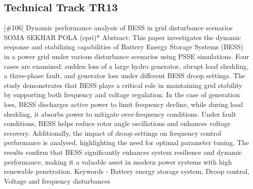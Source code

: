 \clearpage \subsection{Technical Track TR13}\nopagebreak {} \begin{abstract_online} {[\#106] Dynamic performance analysis of BESS in grid disturbance scenarios} {} {SOMA SEKHAR POLA (cpri)*} {} Abstract: This paper investigates the dynamic response and stabilizing capabilities of Battery Energy Storage Systems (BESS) in a power grid under various disturbance scenarios using PSSE simulations. Four cases are examined: sudden loss of a large hydro generator, abrupt load shedding, a three-phase fault, and generator loss under different BESS droop settings. The study demonstrates that BESS plays a critical role in maintaining grid stability by supporting both frequency and voltage regulation. In the case of generation loss, BESS discharges active power to limit frequency decline, while during load shedding, it absorbs power to mitigate over-frequency conditions. Under fault conditions, BESS helps reduce rotor angle oscillations and enhances voltage recovery. Additionally, the impact of droop settings on frequency control performance is analysed, highlighting the need for optimal parameter tuning. The results confirm that BESS significantly enhances system resilience and dynamic performance, making it a valuable asset in modern power systems with high renewable penetration. Keywords - Battery energy storage system, Droop control, Voltage and frequency disturbances \end{abstract_online} 
